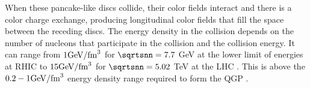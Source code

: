 When these pancake-like discs collide, their color fields interact and there is a color charge exchange, producing longitudinal color fields that fill the space between the receding discs.
%
%
%
%
%
The energy density in the collision depends on the number of nucleons that participate in the collision and the collision energy.
It can range from $1 \rm{ GeV}/\rm{fm}^3$ for $\sqrtsnn = 7.7$ GeV at the lower limit of energies at RHIC \cite{PhysRevC.93.024901} to $15 \rm{ GeV}/\rm{fm}^3$ for $\sqrtsnn = 5.02$ TeV at the LHC \cite{PhysRevC.94.034903, PhysRevLett.109.152303, Jiang:2018wzu}.
This is above the $0.2 - 1 \rm{GeV}/\rm{fm}^3$ energy density range required to form the QGP \cite{Karsch2002, PhysRevD.90.094503}.



